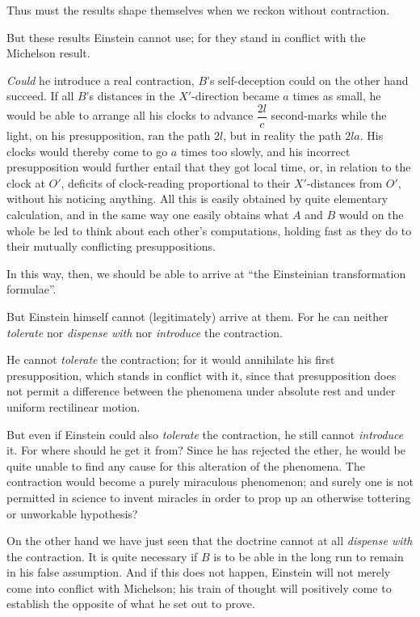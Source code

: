 \documentclass[12pt,a4paper]{article}
\begin{document}
Thus must the results shape themselves when we reckon without contraction.

But these results Einstein cannot use; for they stand in conflict with the
Michelson result.

\emph{Could} he introduce a real contraction, $B$'s self-deception could on
the other hand succeed. If all $B$'s distances in the $X'$-direction became
$a$ times as small, he would be able to arrange all his clocks to advance
$\dfrac{2l}{c}$ second-marks while the light, on his presupposition, ran the
path $2l$, but in reality the path $2la$. His clocks would thereby come to go
$a$ times too slowly, and his incorrect presupposition would further entail
that they got local time, or, in relation to the clock at $O'$, deficits of
clock-reading proportional to their $X'$-distances from $O'$, without his
noticing anything. All this is easily obtained by quite elementary
calculation, and in the same way one easily obtains what $A$ and $B$ would on
the whole be led to think about each other's computations, holding fast as
they do to their mutually conflicting presuppositions.

In this way, then, we should be able to arrive at ``the Einsteinian
transformation formulae''.

But Einstein himself cannot (legitimately) arrive at them. For he can neither
\emph{tolerate} nor \emph{dispense with} nor \emph{introduce} the contraction.

He cannot \emph{tolerate} the contraction; for it would annihilate his first
presupposition, which stands in conflict with it, since that presupposition
does not permit a difference between the phenomena under absolute rest and
under uniform rectilinear motion.

But even if Einstein could also \emph{tolerate} the contraction, he still
cannot \emph{introduce} it. For where should he get it from? Since he has
rejected the ether, he would be quite unable to find any cause for this
alteration of the phenomena. The contraction would become a purely miraculous
phenomenon; and surely one is not permitted in science to invent miracles in
order to prop up an otherwise tottering or unworkable hypothesis?

On the other hand we have just seen that the doctrine cannot at all
\emph{dispense with} the contraction. It is quite necessary if $B$ is to be
able in the long run to remain in his false assumption. And if this does not
happen, Einstein will not merely come into conflict with Michelson; his train
of thought will positively come to establish the opposite of what he set out
to prove.
\end{document}
